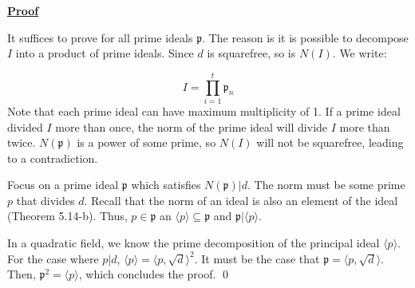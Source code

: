 \documentclass{article}
\newcommand{\Proof}{{
    \vspace{2mm}
    \noindent
    \textbf{
    \underline{Proof}}
}
}
\newcommand{\<}{{{
    \langle
}}}
\def\>{{{
    \rangle
}}}
\newcommand{\pideal}{
    {{\mathfrak{p}}}
}
\begin{document}
\Proof 
It suffices to prove for all prime ideals $\pideal$. The reason is 
it is possible to decompose $I$ into a product of prime ideals. 
Since $d$ is squarefree, so is $N(I)$. We write:

\[
    I = \prod_{i = 1}^t \pideal_n
\]
Note that each prime ideal can have maximum multiplicity of 1. 
If a prime ideal divided $I$ more than once, the norm of the prime ideal 
will divide $I$ more than twice. $N(\pideal)$ is a power of some prime, 
so $N(I)$ will not be squarefree, leading to a contradiction. 

Focus on a prime ideal $\pideal$ which satisfies $N(\pideal)|d$. 
The norm must be some prime $p$ that divides $d$. Recall that 
the norm of an ideal is also an element of the ideal (Theorem 5.14-b). Thus, 
$p \in \pideal$ an $\<p\> \subseteq \pideal$ and $\pideal | \<p\>$. 

In a quadratic field, we know the prime decomposition of the principal 
ideal $\<p\>$. For the case where $p|d$, $\<p\> = \<p, \sqrt{d}\>^2$. 
It must be the case that $\pideal = \<p, \sqrt{d}\>$. Then, $\pideal^2 = \<p\>$, 
which concludes the proof. 
\qed
\end{document}
